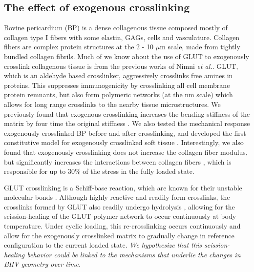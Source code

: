 \subsection{The effect of exogenous crosslinking}

	Bovine pericardium (BP) is a dense collagenous tissue composed mostly of collagen type I fibers with some elastin, GAGs, cells and vasculature. 
	Collagen fibers are complex protein structures at the 2 - 10 $\mu$m scale, made from tightly bundled collagen fibrils. 
	Much of we know about the use of GLUT to exogenously crosslink collagenous tissue is from the previous works of Nimni \textit{et al.}\cite{cheung_mechanism_1990, nimni_chemically_1987, cheung_mechanism_1985, gendler_toxic_1984, cheung_presence_1983, cheung_mechanism_1982, cheung_mechanism_1982II}. 
	GLUT, which is an aldehyde based crosslinker, aggressively crosslinks free amines in proteins. 
	This suppresses immunogenicity by crosslinking all cell membrane protein remnants, but also form polymeric networks (at the nm scale) which allows for long range crosslinks to the nearby tissue microstructures. 
	We previously found that exogenous crosslinking increases the bending stiffness of the matrix by four time the original stiffness \cite{mirnajafi_effects_2010}.
	We also tested the mechanical response exogenously crosslinked BP before and after crosslinking, and developed the first constitutive model for exogenously crosslinked soft tissue \cite{sacks_novel_2016}. 
	Interestingly, we also found that exogenously crosslinking does not increase the collagen fiber modulus, but significantly increases the interactions between collagen fibers \cite{sacks_novel_2016}, which is responsible for up to 30\% of the stress in the fully loaded state. 


	GLUT crosslinking is a Schiff-base reaction, which are known for their unstable molecular bonds \cite{migneault_glutaraldehyde_2004, damink_glutaraldehyde_1995}. 
	Although highly reactive and readily form crosslinks, the crosslinks formed by GLUT also readily undergo hydrolysis \cite{migneault_glutaraldehyde_2004}, allowing for the scission-healing of the GLUT polymer network to occur continuously at body temperature. 
	Under cyclic loading, this re-crosslinking occurs continuously and allow for the exogenously crosslinked matrix to gradually change in reference configuration to the current loaded state. 
	\emph{We hypothesize that this scission-healing behavior could be linked to the  mechanisms that underlie the changes in BHV geometry over time}. 
	
